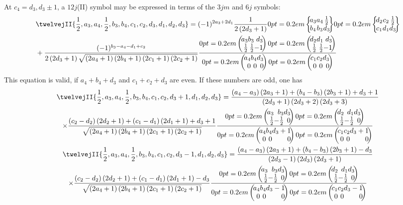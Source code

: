 At $c_{4}=d_{3}, d_{3} \pm 1$, a $12j$(II) symbol may be expressed in terms of the $3 j m$ and $6 j$ symbols:
\begin{align}
& \twelvejII{\frac{1}{2},a_{3},a_{4},\frac{1}{2},b_{3},b_{4},c_{1},c_{2},d_{3},d_{1},d_{2},d_{3}}=(-1)^{2 a_{3}+2 d_{1}} \frac{1}{2\left(2 d_{3}+1\right)}\sixj{a_{3}}{a_{4}}{\frac{1}{2}}{b_{4}}{b_{3}}{d_{3}}\sixj{d_{2}}{c_{2}}{\frac{1}{2}}{c_{1}}{d_{1}}{d_{3}}  \notag\\
& +\frac{(-1)^{b_{3}-a_{4}-d_{1}+c_{2}}}{2\left(2 d_{3}+1\right) \sqrt{\left(2 a_{4}+1\right)\left(2 b_{4}+1\right)\left(2 c_{1}+1\right)\left(2 c_{2}+1\right)}} \frac{\threej{a_{3} }{ b_{3} }{ d_{3} }{\frac{1}{2} }{ \frac{1}{2} }{ -1}\threej{d_{2} }{ d_{1} }{ d_{3} }{\frac{1}{2} }{ \frac{1}{2} }{ -1}}{\threej{a_{4} }{ b_{4} }{ d_{3} }{0 }{ 0 }{ 0}\threej{c_{1} }{ c_{2} }{ d_{3} }{0 }{ 0 }{ 0}} \label{eq:10:13:36}
\end{align}
This equation is valid, if $a_{4}+b_{4}+d_{3}$ and $c_{1}+c_{2}+d_{3}$ are even. If these numbers are odd, one has
\begin{gather}
\twelvejII{\frac{1}{2},a_{3},a_{4},\frac{1}{2},b_{3},b_{4},c_{1},c_{2},d_{3}+1,d_{1},d_{2},d_{3}}=\frac{\left(a_{4}-a_{3}\right)\left(2 a_{3}+1\right)+\left(b_{4}-b_{3}\right)\left(2 b_{3}+1\right)+d_{3}+1}{\left(2 d_{3}+1\right)\left(2 d_{3}+2\right)\left(2 d_{3}+3\right)}  \notag\\
\times \frac{\left(c_{2}-d_{2}\right)\left(2 d_{2}+1\right)+\left(c_{1}-d_{1}\right)\left(2 d_{1}+1\right)+d_{3}+1}{\sqrt{\left(2 a_{4}+1\right)\left(2 b_{4}+1\right)\left(2 c_{1}+1\right)\left(2 c_{2}+1\right)}} \frac{\threej{a_{3} }{ b_{3} }{ d_{3} }{\frac{1}{2} }{ -\frac{1}{2} }{ 0}\threej{d_{2} }{ d_{1} }{ d_{3} }{\frac{1}{2} }{ -\frac{1}{2} }{ 0}}{\threej{a_{4} }{ b_{4} }{ d_{3}+1 }{0 }{ 0 }{ 0}\threej{c_{1} }{ c_{2} }{ d_{3}+1 }{0 }{ 0 }{ 0}}  \label{eq:10:13:37}\\
\twelvejII{\frac{1}{2},a_{3},a_{4},\frac{1}{2},b_{3},b_{4},c_{1},c_{2},d_{3}-1,d_{1},d_{2},d_{3}}=\frac{\left(a_{4}-a_{3}\right)\left(2 a_{3}+1\right)+\left(b_{4}-b_{3}\right)\left(2 b_{3}+1\right)-d_{3}}{\left(2 d_{3}-1\right)\left(2 d_{3}\right)\left(2 d_{3}+1\right)}  \notag\\
\times \frac{\left(c_{2}-d_{2}\right)\left(2 d_{2}+1\right)+\left(c_{1}-d_{1}\right)\left(2 d_{1}+1\right)-d_{3}}{\sqrt{\left(2 a_{4}+1\right)\left(2 b_{4}+1\right)\left(2 c_{1}+1\right)\left(2 c_{2}+1\right)}} \frac{\threej{a_{3} }{ b_{3} }{ d_{3} }{\frac{1}{2} }{ -\frac{1}{2} }{ 0}\threej{d_{2} }{ d_{1} }{ d_{3} }{\frac{1}{2} }{ -\frac{1}{2} }{ 0}}{\threej{a_{4} }{ b_{4} }{ d_{3}-1 }{0 }{ 0 }{ 0}\threej{c_{1} }{ c_{2} }{ d_{3}-1 }{0 }{ 0 }{ 0}} \label{eq:10:13:38}
\end{gather}
